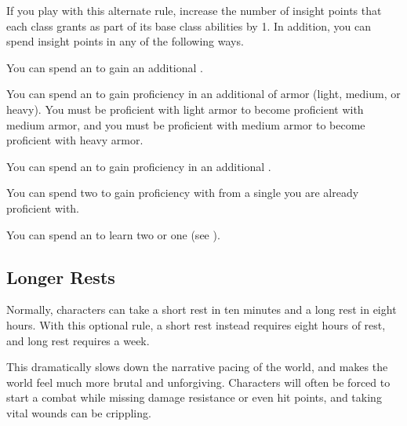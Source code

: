         If you play with this alternate rule, increase the number of insight points that each class grants as part of its base class abilities by 1.
        In addition, you can spend insight points in any of the following ways.
        \begin{raggeditemize}
            \item You can spend an  to gain an additional .
            \item You can spend an  to gain proficiency in an additional  of armor (light, medium, or heavy).
                You must be proficient with light armor to become proficient with medium armor, and you must be proficient with medium armor to become proficient with heavy armor.
            \item You can spend an  to gain proficiency in an additional .
            \item You can spend two  to gain proficiency with  from a single  you are already proficient with.
            \item You can spend an  to learn two  or one  (see ).
        \end{raggeditemize}

    \subsection{Longer Rests}\label{Longer Rests}
        Normally, characters can take a short rest in ten minutes and a long rest in eight hours.
        With this optional rule, a short rest instead requires eight hours of rest, and long rest requires a week.

        This dramatically slows down the narrative pacing of the world, and makes the world feel much more brutal and unforgiving.
        Characters will often be forced to start a combat while missing damage resistance or even hit points, and taking vital wounds can be crippling.

